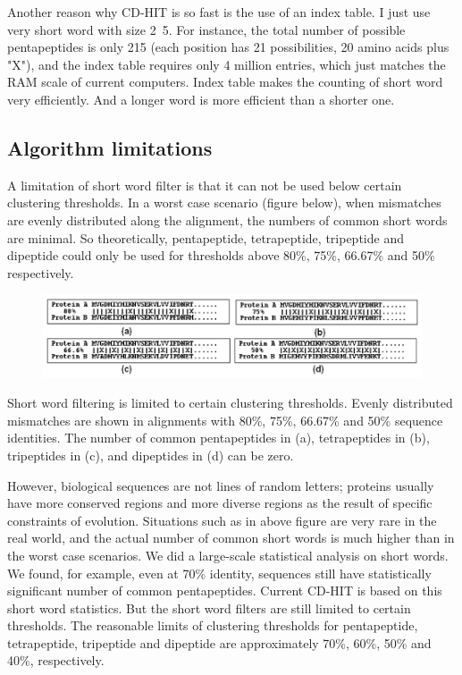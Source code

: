 \documentclass[12pt,a4paper]{article}
\begin{document}
Another reason why CD-HIT is so fast is the use of an index table. I just use very short word with size 2~5. For instance, the total number of possible pentapeptides is only 215 (each position has 21 possibilities, 20 amino acids plus "X"), and the index table requires only 4 million entries, which just matches the RAM scale of current computers. Index table makes the counting of short word very efficiently. And a longer word is more efficient than a shorter one.

\subsection{Algorithm limitations }

A limitation of short word filter is that it can not be used below certain clustering thresholds. In a worst case scenario (figure below), when mismatches are evenly distributed along the alignment, the numbers of common short words are minimal. So theoretically, pentapeptide, tetrapeptide, tripeptide and dipeptide could only be used for thresholds above 80\%, 75\%, 66.67\% and 50\% respectively.

\begin{figure}[!h]
\includegraphics[width=\textwidth]{Figure1.png}

\end{figure}

Short word filtering is limited to certain clustering thresholds. Evenly distributed mismatches are shown in alignments with 80\%, 75\%, 66.67\% and 50\% sequence identities. The number of common pentapeptides in (a), tetrapeptides in (b), tripeptides in (c), and dipeptides in (d) can be zero.

However, biological sequences are not lines of random letters; proteins usually have more conserved regions and more diverse regions as the result of specific constraints of evolution. Situations such as in above figure are very rare in the real world, and the actual number of common short words is much higher than in the worst case scenarios. We did a large-scale statistical analysis on short words. We found, for example, even at 70\% identity, sequences still have statistically significant number of common pentapeptides. Current CD-HIT is based on this short word statistics. But the short word filters are still limited to certain thresholds. The reasonable limits of clustering thresholds for pentapeptide, tetrapeptide, tripeptide and dipeptide are approximately 70\%, 60\%, 50\% and 40\%, respectively.
\end{document}
